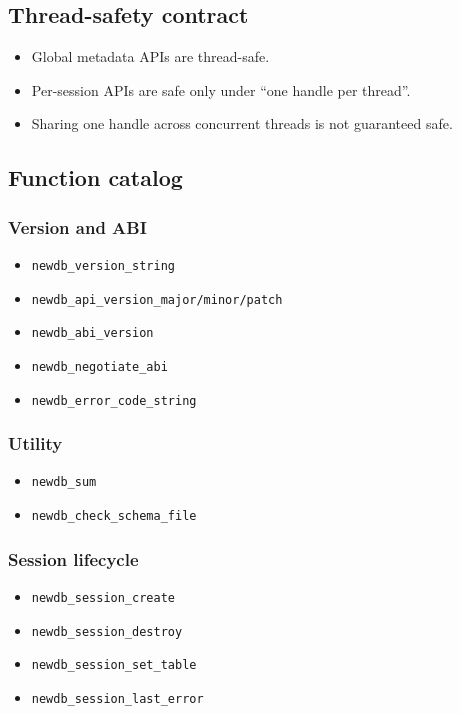 \documentclass[11pt,a4paper]{article}
\begin{document}
\subsection{Thread-safety contract}
\begin{itemize}
  \item Global metadata APIs are thread-safe.
  \item Per-session APIs are safe only under ``one handle per thread''.
  \item Sharing one handle across concurrent threads is not guaranteed safe.
\end{itemize}

\subsection{Function catalog}
\subsubsection*{Version and ABI}
\begin{itemize}
  \item \texttt{newdb\_version\_string}
  \item \texttt{newdb\_api\_version\_major/minor/patch}
  \item \texttt{newdb\_abi\_version}
  \item \texttt{newdb\_negotiate\_abi}
  \item \texttt{newdb\_error\_code\_string}
\end{itemize}

\subsubsection*{Utility}
\begin{itemize}
  \item \texttt{newdb\_sum}
  \item \texttt{newdb\_check\_schema\_file}
\end{itemize}

\subsubsection*{Session lifecycle}
\begin{itemize}
  \item \texttt{newdb\_session\_create}
  \item \texttt{newdb\_session\_destroy}
  \item \texttt{newdb\_session\_set\_table}
  \item \texttt{newdb\_session\_last\_error}
\end{itemize}
\end{document}

